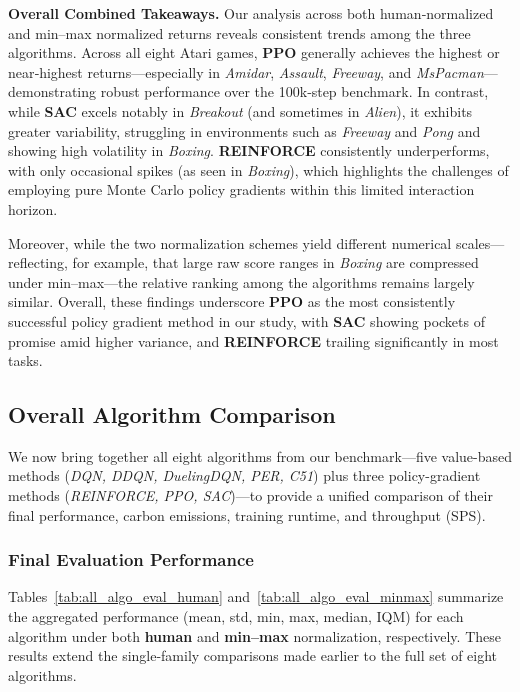 \noindent
\textbf{Overall Combined Takeaways.}
Our analysis across both human‐normalized and min--max normalized returns reveals consistent trends among the three algorithms. Across all eight Atari games, \textbf{PPO} generally achieves the highest or near‐highest returns—especially in \emph{Amidar}, \emph{Assault}, \emph{Freeway}, and \emph{MsPacman}—demonstrating robust performance over the 100k‐step benchmark. In contrast, while \textbf{SAC} excels notably in \emph{Breakout} (and sometimes in \emph{Alien}), it exhibits greater variability, struggling in environments such as \emph{Freeway} and \emph{Pong} and showing high volatility in \emph{Boxing}. \textbf{REINFORCE} consistently underperforms, with only occasional spikes (as seen in \emph{Boxing}), which highlights the challenges of employing pure Monte Carlo policy gradients within this limited interaction horizon.

Moreover, while the two normalization schemes yield different numerical scales—reflecting, for example, that large raw score ranges in \emph{Boxing} are compressed under min--max—the relative ranking among the algorithms remains largely similar. Overall, these findings underscore \textbf{PPO} as the most consistently successful policy gradient method in our study, with \textbf{SAC} showing pockets of promise amid higher variance, and \textbf{REINFORCE} trailing significantly in most tasks.


\subsection{Overall Algorithm Comparison}
\label{subsec:overall_algo_comparison}

We now bring together all eight algorithms from our benchmark—five value-based methods 
(\emph{DQN, DDQN, DuelingDQN, PER, C51}) plus three policy-gradient methods 
(\emph{REINFORCE, PPO, SAC})—to provide a unified comparison of their final performance, 
carbon emissions, training runtime, and throughput (SPS).

\subsubsection{Final Evaluation Performance}

Tables~\ref{tab:all_algo_eval_human} and~\ref{tab:all_algo_eval_minmax} summarize the 
aggregated performance (mean, std, min, max, median, IQM) for each algorithm under both 
\textbf{human} and \textbf{min--max} normalization, respectively. These results extend 
the single-family comparisons made earlier to the full set of eight algorithms.

